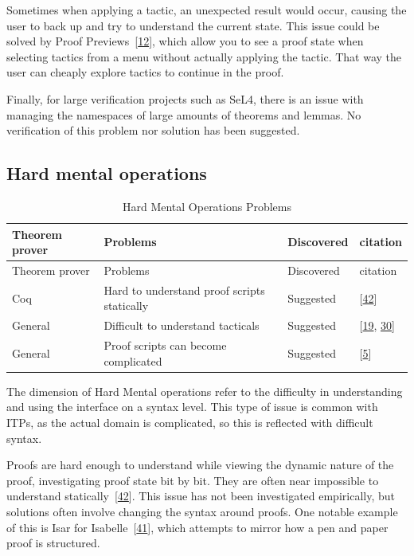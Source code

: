 \documentclass[
]{article}
\begin{document}
Sometimes when applying a tactic, an unexpected result would occur,
causing the user to back up and try to understand the current state.
This issue could be solved by Proof
Previews~{[}\protect\hyperlink{ref-berman_development_2014}{12}{]},
which allow you to see a proof state when selecting tactics from a menu
without actually applying the tactic. That way the user can cheaply
explore tactics to continue in the proof.

Finally, for large verification projects such as SeL4, there is an issue
with managing the namespaces of large amounts of theorems and lemmas. No
verification of this problem nor solution has been suggested.

\hypertarget{hard-mental-operations-1}{%
\subsection{Hard mental operations}\label{hard-mental-operations-1}}

\hypertarget{tbl:hard_mental_operations}{}
\begin{longtable}[]{@{}llll@{}}
\caption{\label{tbl:hard_mental_operations}Hard Mental Operations
Problems}\tabularnewline
\toprule
Theorem prover & Problems & Discovered & citation \\
\midrule
\endfirsthead
\toprule
Theorem prover & Problems & Discovered & citation \\
\midrule
\endhead
Coq & Hard to understand proof scripts statically & Suggested &
{[}\protect\hyperlink{ref-zacchiroli_user_2007}{42}{]} \\
General & Difficult to understand tacticals & Suggested &
{[}\protect\hyperlink{ref-grov_tinker_2018}{19},
\protect\hyperlink{ref-lin_understanding_2016}{30}{]} \\
General & Proof scripts can become complicated & Suggested &
{[}\protect\hyperlink{ref-aspinall_towards_2016}{5}{]} \\
\bottomrule
\end{longtable}

The dimension of Hard Mental operations refer to the difficulty in
understanding and using the interface on a syntax level. This type of
issue is common with ITPs, as the actual domain is complicated, so this
is reflected with difficult syntax.

Proofs are hard enough to understand while viewing the dynamic nature of
the proof, investigating proof state bit by bit. They are often near
impossible to understand
statically~{[}\protect\hyperlink{ref-zacchiroli_user_2007}{42}{]}. This
issue has not been investigated empirically, but solutions often involve
changing the syntax around proofs. One notable example of this is Isar
for Isabelle~{[}\protect\hyperlink{ref-wenzel_structured_2006}{41}{]},
which attempts to mirror how a pen and paper proof is structured.
\end{document}
